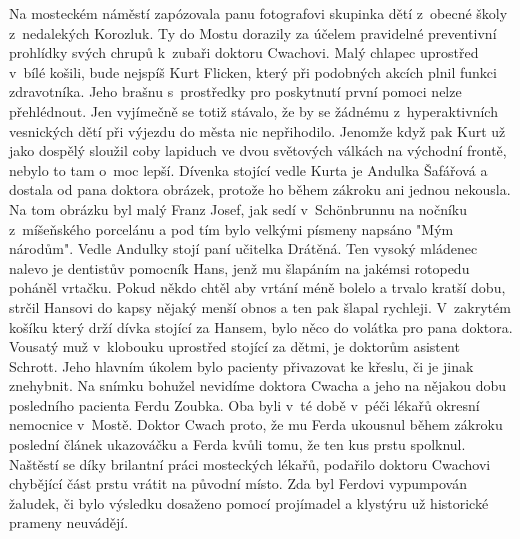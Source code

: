 
Na mosteckém náměstí zapózovala panu fotografovi skupinka dětí
z~obecné školy z~nedalekých Korozluk. Ty do Mostu dorazily za účelem
pravidelné preventivní prohlídky svých chrupů k~zubaři doktoru
Cwachovi. Malý chlapec uprostřed v~bílé košili, bude nejspíš Kurt
Flicken, který při podobných akcích plnil funkci zdravotníka. Jeho
brašnu s~prostředky pro poskytnutí první pomoci nelze přehlédnout. Jen
vyjímečně se totiž stávalo, že by se žádnému z~hyperaktivních
vesnických dětí při výjezdu do města nic nepřihodilo. Jenomže když pak
Kurt už jako dospělý sloužil coby lapiduch ve dvou světových válkách
na východní frontě, nebylo to tam o~moc lepší. Dívenka stojící vedle
Kurta je Andulka Šafářová a dostala od pana doktora obrázek, protože
ho během zákroku ani jednou nekousla. Na tom obrázku byl malý Franz
Josef, jak sedí v~Schönbrunnu na nočníku z~míšeňského porcelánu a pod
tím bylo velkými písmeny napsáno "Mým národům". Vedle Andulky stojí
paní učitelka Drátěná. Ten vysoký mládenec nalevo je dentistův
pomocník Hans, jenž mu šlapáním na jakémsi rotopedu poháněl vrtačku.
Pokud někdo chtěl aby vrtání méně bolelo a trvalo kratší dobu, strčil
Hansovi do kapsy nějaký menší obnos a ten pak šlapal rychleji.
V~zakrytém košíku který drží dívka stojící za Hansem, bylo něco do
volátka pro pana doktora. Vousatý muž v~klobouku uprostřed stojící za
dětmi, je doktorům asistent Schrott. Jeho hlavním úkolem bylo pacienty
přivazovat ke křeslu, či je jinak znehybnit. Na snímku bohužel
nevidíme doktora Cwacha a jeho na nějakou dobu posledního pacienta
Ferdu Zoubka. Oba byli v~té době v~péči lékařů okresní nemocnice
v~Mostě. Doktor Cwach proto, že mu Ferda ukousnul během zákroku poslední
článek ukazováčku a Ferda kvůli tomu, že ten kus prstu spolknul.
Naštěstí se díky brilantní práci mosteckých lékařů, podařilo doktoru
Cwachovi chybějící část prstu vrátit na původní místo. Zda byl Ferdovi
vypumpován žaludek, či bylo výsledku dosaženo pomocí projímadel a
klystýru už historické prameny neuvádějí.
